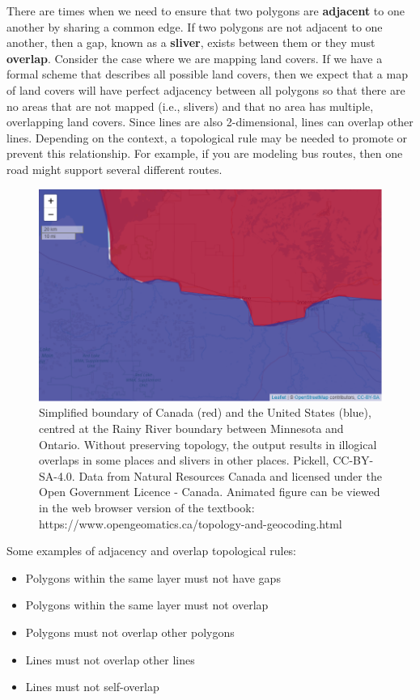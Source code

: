 \documentclass[
]{book}
\providecommand{\tightlist}{%
  \setlength{\itemsep}{0pt}\setlength{\parskip}{0pt}}
\begin{document}
There are times when we need to ensure that two polygons are \textbf{adjacent} to one another by sharing a common edge. If two polygons are not adjacent to one another, then a gap, known as a \textbf{sliver}, exists between them or they must \textbf{overlap}. Consider the case where we are mapping land covers. If we have a formal scheme that describes all possible land covers, then we expect that a map of land covers will have perfect adjacency between all polygons so that there are no areas that are not mapped (i.e., slivers) and that no area has multiple, overlapping land covers. Since lines are also 2-dimensional, lines can overlap other lines. Depending on the context, a topological rule may be needed to promote or prevent this relationship. For example, if you are modeling bus routes, then one road might support several different routes.

\begin{figure}
\includegraphics[width=1\linewidth]{images/07-Canada-US-border-simplified-leaflet} \caption{Simplified boundary of Canada (red) and the United States (blue), centred at the Rainy River boundary between Minnesota and Ontario. Without preserving topology, the output results in illogical overlaps in some places and slivers in other places. Pickell, CC-BY-SA-4.0. Data from Natural Resources Canada and licensed under the Open Government Licence - Canada. Animated figure can be viewed in the web browser version of the textbook: https://www.opengeomatics.ca/topology-and-geocoding.html}\label{fig:unnamed-chunk-21}
\end{figure}

Some examples of adjacency and overlap topological rules:

\begin{itemize}
\tightlist
\item
  Polygons within the same layer must not have gaps
\item
  Polygons within the same layer must not overlap
\item
  Polygons must not overlap other polygons
\item
  Lines must not overlap other lines
\item
  Lines must not self-overlap
\end{itemize}
\end{document}
